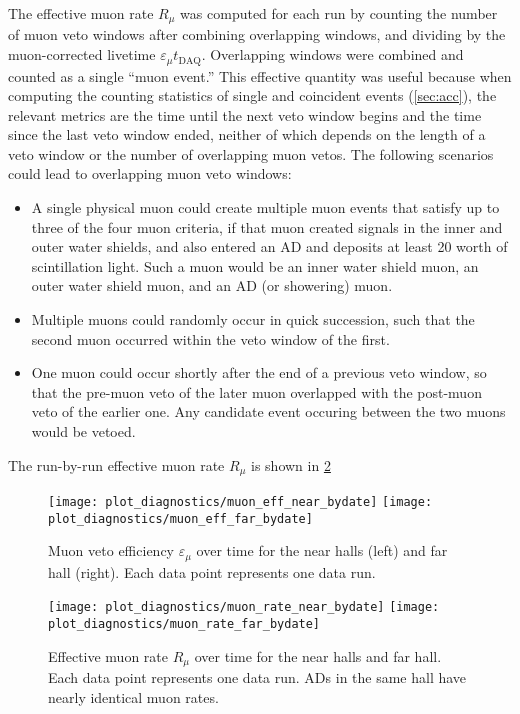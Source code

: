 The effective muon rate $R_\mu$ was computed for each run
by counting the number of muon veto windows
after combining overlapping windows, and dividing by the muon-corrected
livetime $\varepsilon_\mu t_{\text{DAQ}}$.
Overlapping windows were combined and counted as a single ``muon event.''
This effective quantity was useful
because when computing the counting statistics of single and coincident events
(\cref{sec:acc}),
the relevant metrics are the time until the next veto window begins
and the time since the last veto window ended,
neither of which depends on the length of a veto window
or the number of overlapping muon vetos.
The following scenarios could lead to overlapping muon veto windows:
\begin{itemize}
    \item A single physical muon could create multiple muon events
        that satisfy up to three of the four muon criteria,
        if that muon created signals in the inner and outer water shields,
        and also entered an AD and deposits at least \SI{20}{\mev} worth of scintillation light.
        Such a muon would be an inner water shield muon,
        an outer water shield muon, and an AD
        (or showering) muon.
    \item Multiple muons could randomly occur in quick succession,
        such that the second muon occurred within the veto window of the first.
    \item One muon could occur shortly after the end of a previous veto window,
        so that the pre-muon veto of the later muon overlapped with the
        post-muon veto of the earlier one.
        Any candidate event occuring between the two muons would be vetoed.
\end{itemize}
The run-by-run effective muon rate $R_\mu$ is shown in \cref{fig:muon_rate}

\begin{figure}
    \centering
    \texttt{[image: plot\_diagnostics/muon\_eff\_near\_bydate]}
    \texttt{[image: plot\_diagnostics/muon\_eff\_far\_bydate]}
    \caption[Muon veto efficiency over time]{
        Muon veto efficiency $\varepsilon_\mu$ over time for
        the near halls (left) and far hall (right).
        Each data point represents one data run.
    }
    \label{fig:veto_eff}
\end{figure}

\begin{figure}
    \centering
    \texttt{[image: plot\_diagnostics/muon\_rate\_near\_bydate]}
    \texttt{[image: plot\_diagnostics/muon\_rate\_far\_bydate]}
    \caption[Effective muon rate over time]{
        Effective muon rate $R_\mu$ over time for the near halls and far hall.
        Each data point represents one data run.
        ADs in the same hall have nearly identical muon rates.
    }
    \label{fig:muon_rate}
\end{figure}

